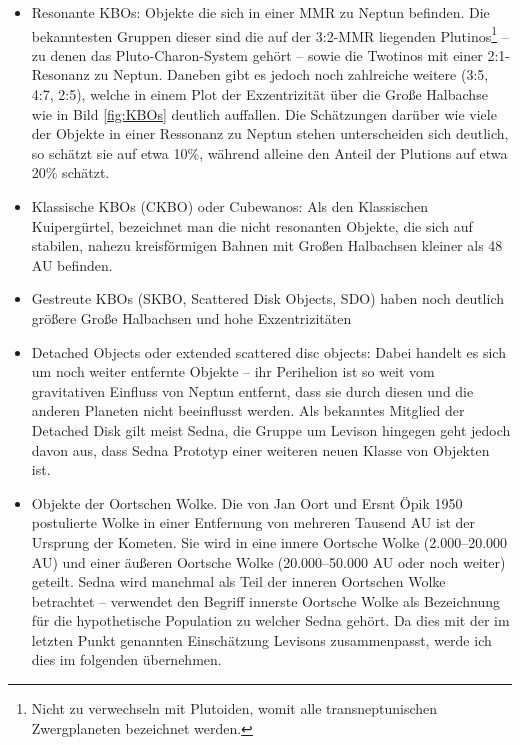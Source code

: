 \documentclass[12pt,a4paper,twoside]{article}
\renewcommand{\cite}{\citep}
\begin{document}
\begin{itemize}
\item Resonante KBOs: Objekte die sich in einer MMR zu Neptun befinden. Die bekanntesten Gruppen dieser sind die auf der 3:2-MMR liegenden Plutinos\footnote{Nicht zu verwechseln mit Plutoiden, womit alle transneptunischen Zwergplaneten bezeichnet werden.} -- zu denen das Pluto-Charon-System gehört -- sowie die Twotinos mit einer 2:1-Resonanz zu Neptun. Daneben gibt es jedoch noch zahlreiche weitere (3:5, 4:7, 2:5), welche in einem Plot der Exzentrizität über die Große Halbachse wie in Bild \ref{fig:KBOs} deutlich auffallen\cite{Levison2008}. %
Die Schätzungen darüber wie viele der Objekte in einer Ressonanz zu Neptun stehen unterscheiden sich deutlich, %
so schätzt sie \cite{Trujillo2001,Levison2008} auf etwa 10\%, während \cite{Kavelaars2008,Levison2008} alleine den Anteil der Plutions auf etwa 20\% schätzt.
\item Klassische KBOs (CKBO) oder Cubewanos: Als den Klassischen Kuipergürtel, bezeichnet man die nicht resonanten Objekte, die sich auf stabilen, nahezu kreisförmigen Bahnen mit Großen Halbachsen kleiner als 48 AU befinden.
\item Gestreute KBOs (SKBO, Scattered Disk Objects, SDO) haben noch deutlich größere Große Halbachsen und hohe Exzentrizitäten %
\item Detached Objects oder extended scattered disc objects: Dabei handelt es sich um noch weiter entfernte Objekte -- ihr Perihelion ist so weit vom gravitativen Einfluss von Neptun entfernt, dass sie durch diesen und die anderen Planeten nicht beeinflusst werden. Als bekanntes Mitglied der Detached Disk gilt meist Sedna, die Gruppe um Levison hingegen geht jedoch davon aus, dass Sedna Prototyp einer weiteren neuen Klasse von Objekten ist\cite{Morbidelli2004,Kenyon2004,Brasser2006,Levison2008}. %
\item Objekte der Oortschen Wolke. Die von Jan Oort und Ersnt Öpik 1950 postulierte Wolke in einer Entfernung von mehreren Tausend AU ist der Ursprung der Kometen. Sie wird in eine innere Oortsche  Wolke (2.000–20.000 AU) und einer äußeren Oortsche Wolke (20.000–50.000 AU oder noch weiter) geteilt. Sedna wird manchmal als Teil der inneren Oortschen Wolke betrachtet – \cite{Brasser2008} verwendet den Begriff innerste Oortsche Wolke als Bezeichnung für die hypothetische Population zu welcher Sedna gehört. Da dies mit der im letzten Punkt genannten Einschätzung Levisons zusammenpasst, werde ich dies im folgenden übernehmen. %
\end{itemize} %
\end{document}
